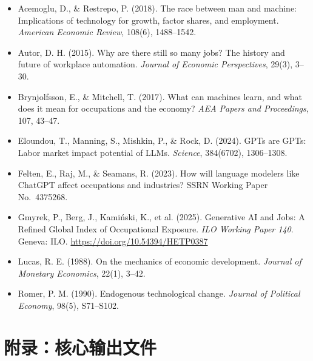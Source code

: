 \documentclass[12pt,a4paper]{ctexart}
\begin{document}
\begin{itemize}
    \item Acemoglu, D., \& Restrepo, P. (2018).
    The race between man and machine: Implications of technology for growth, factor shares, and employment.
    \textit{American Economic Review}, 108(6), 1488--1542.

    \item Autor, D. H. (2015).
    Why are there still so many jobs? The history and future of workplace automation.
    \textit{Journal of Economic Perspectives}, 29(3), 3--30.

    \item Brynjolfsson, E., \& Mitchell, T. (2017).
    What can machines learn, and what does it mean for occupations and the economy?
    \textit{AEA Papers and Proceedings}, 107, 43--47.

    \item Eloundou, T., Manning, S., Mishkin, P., \& Rock, D. (2024).
    GPTs are GPTs: Labor market impact potential of LLMs.
    \textit{Science}, 384(6702), 1306--1308.

    \item Felten, E., Raj, M., \& Seamans, R. (2023).
    How will language modelers like ChatGPT affect occupations and industries?
    SSRN Working Paper No.\ 4375268.

    \item Gmyrek, P., Berg, J., Kamiński, K., et al. (2025).
    Generative AI and Jobs: A Refined Global Index of Occupational Exposure.
    \textit{ILO Working Paper 140}. Geneva: ILO.
    \url{https://doi.org/10.54394/HETP0387}

    \item Lucas, R. E. (1988).
    On the mechanics of economic development.
    \textit{Journal of Monetary Economics}, 22(1), 3--42.

    \item Romer, P. M. (1990).
    Endogenous technological change.
    \textit{Journal of Political Economy}, 98(5), S71--S102.
\end{itemize}

\appendix
\section{附录：核心输出文件}
\end{document}
